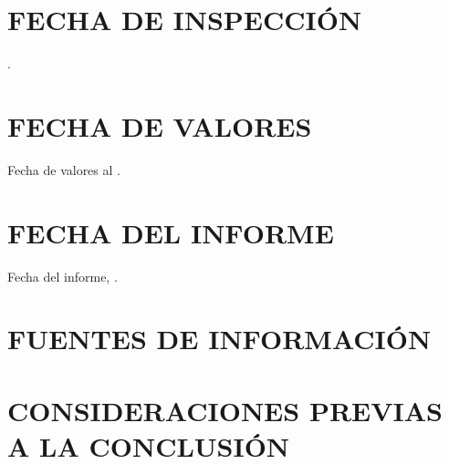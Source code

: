 \documentclass[10pt,letter]{report}
\begin{document}
%

%

%


%

%

\espacio{1cm}

\section{FECHA DE INSPECCI\'ON}\label{sec:l}
\fechaInspeccion.

\section{FECHA DE VALORES}\label{sec:m}
Fecha de valores al \fechaValores.

\section{FECHA DEL INFORME}\label{sec:n}
Fecha del informe, \fechaInforme.

\section{FUENTES DE INFORMACI\'ON}\label{sec:nn}
\begin{itemize}
	
\end{itemize}
\section{CONSIDERACIONES PREVIAS A LA CONCLUSI\'ON}\label{sec:o}

\end{document}
